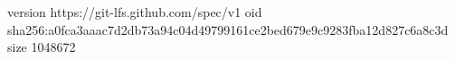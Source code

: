version https://git-lfs.github.com/spec/v1
oid sha256:a0fca3aaac7d2db73a94c04d49799161ce2bed679e9c9283fba12d827c6a8c3d
size 1048672
